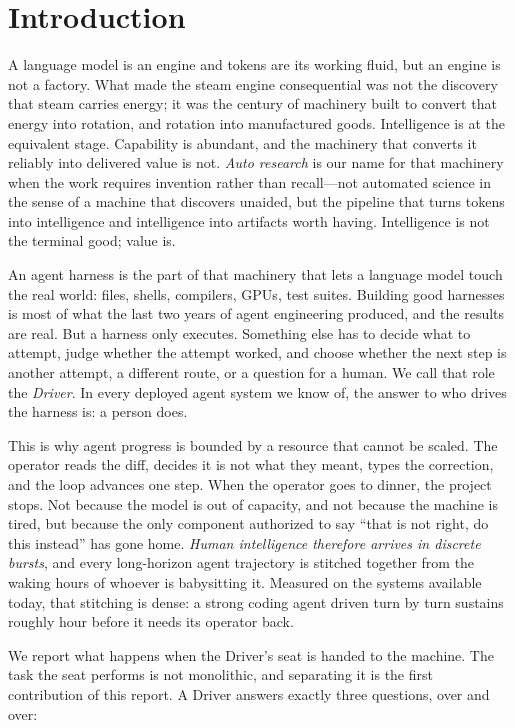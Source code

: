 \section{Introduction}
\label{sec:introduction}

A language model is an engine and tokens are its working fluid, but an engine is not
a factory. What made the steam engine consequential was not the discovery that steam
carries energy; it was the century of machinery built to convert that energy into
rotation, and rotation into manufactured goods. Intelligence is at the equivalent
stage. Capability is abundant, and the machinery that converts it reliably into
delivered value is not. \emph{Auto research} is our name for that machinery when the
work requires invention rather than recall---not automated science in the sense of a
machine that discovers unaided, but the pipeline that turns tokens into intelligence
and intelligence into artifacts worth having. Intelligence is not the terminal good;
value is.

An agent harness is the part of that machinery that lets a language model touch the
real world: files, shells, compilers, GPUs, test suites. Building good harnesses is
most of what the last two years of agent engineering produced, and the results are
real. But a harness only executes. Something else has to decide what to attempt,
judge whether the attempt worked, and choose whether the next step is another
attempt, a different route, or a question for a human. We call that role the
\emph{Driver}. In every deployed agent system we know of, the answer to who drives
the harness is: a person does.

This is why agent progress is bounded by a resource that cannot be scaled. The
operator reads the diff, decides it is not what they meant, types the correction,
and the loop advances one step. When the operator goes to dinner, the project stops.
Not because the model is out of capacity, and not because the machine is tired, but
because the only component authorized to say ``that is not right, do this instead''
has gone home. \emph{Human intelligence therefore arrives in discrete bursts},
and every long-horizon agent trajectory is stitched together from the waking hours of
whoever is babysitting it. Measured on the systems available today, that stitching is
dense: a strong coding agent driven turn by turn sustains roughly
\CodexEndurance{} hour before it needs its operator back.

We report what happens when the Driver's seat is handed to the machine. The task the
seat performs is not monolithic, and separating it is the first contribution of this
report. A Driver answers exactly three questions, over and over:

